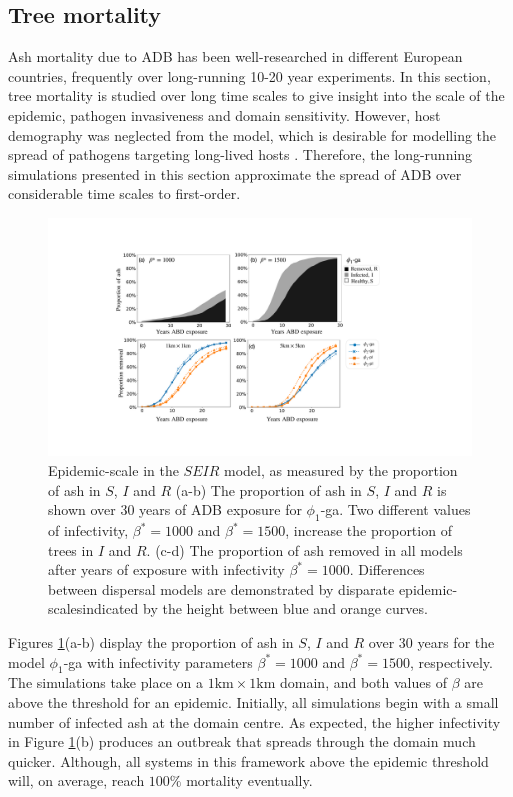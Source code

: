 \subsection{Tree mortality}
\label{sec:tree-mortality}

Ash mortality due to ADB has been well-researched in different European countries, frequently over long-running 10-20 year experiments.
In this section, tree mortality is studied over long time scales to give insight into the scale of the epidemic, pathogen invasiveness and domain sensitivity.
However, host demography was neglected from the model, which is desirable for modelling the spread of pathogens targeting long-lived hosts \cite{doi:10.1098/rstb.1996.0059}.
Therefore, the long-running simulations presented in this section approximate the spread of ADB over considerable time scales to first-order.

\begin{figure}
    \centering
    \includegraphics[scale=0.42]{chapter6/figures/fig6-mortality.pdf}
    \caption{Epidemic-scale in the $SEIR$ model, as measured by the proportion of ash in $S$, $I$ and $R$ (a-b) 
    The proportion of ash in $S$, $I$ and $R$ is shown over $30$ years of ADB exposure for $\phi_1$-ga. 
    Two different values of infectivity, $\beta^*=1000$ and $\beta^*=1500$, increase the proportion of trees in $I$ and $R$. 
    (c-d) The proportion of ash removed in all models after years of exposure with infectivity $\beta^*=1000$. 
    Differences between dispersal models are demonstrated by disparate epidemic-scales\textemdash indicated by the height between blue and orange curves.}
    \label{fig:ash-mortalty}
\end{figure}

Figures \ref{fig:ash-mortalty}(a-b) display the proportion of ash in $S$, $I$ and $R$ over $30$ years for the model $\phi_1$-ga with 
infectivity parameters $\beta^*=1000$ and $\beta^*=1500$, respectively. The simulations take place on a $1\mathrm{km}\times 1 \mathrm{km}$ domain, 
and both values of $\beta$ are above the threshold for an epidemic.
Initially, all simulations begin with a small number of infected ash at the domain centre.
As expected, the higher infectivity in Figure \ref{fig:ash-mortalty}(b) produces an outbreak that spreads through the domain much quicker.
Although, all systems in this framework above the epidemic threshold will, on average, reach $100\%$ mortality eventually.

